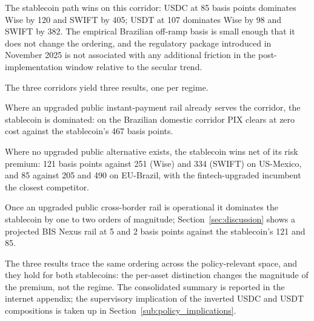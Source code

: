 The stablecoin path wins on this corridor: USDC at 85 basis points dominates Wise by 120 and SWIFT by 405; USDT at 107 dominates Wise by 98 and SWIFT by 382. The empirical Brazilian off-ramp basis is small enough that it does not change the ordering, and the regulatory package introduced in November 2025 is not associated with any additional friction in the post-implementation window relative to the secular trend.

The three corridors yield three results, one per regime.

\begin{result}\label{res:dominated}
Where an upgraded public instant-payment rail already serves the corridor, the stablecoin is dominated: on the Brazilian domestic corridor PIX clears at zero cost against the stablecoin's 467 basis points.
\end{result}

\begin{result}\label{res:wins}
Where no upgraded public alternative exists, the stablecoin wins net of its risk premium: 121 basis points against 251 (Wise) and 334 (SWIFT) on US-Mexico, and 85 against 205 and 490 on EU-Brazil, with the fintech-upgraded incumbent the closest competitor.
\end{result}

\begin{result}\label{res:absorbed}
Once an upgraded public cross-border rail is operational it dominates the stablecoin by one to two orders of magnitude; Section~\ref{sec:discussion} shows a projected BIS Nexus rail at 5 and 2 basis points against the stablecoin's 121 and 85.
\end{result}

The three results trace the same ordering across the policy-relevant space, and they hold for both stablecoins: the per-asset distinction changes the magnitude of the premium, not the regime. The consolidated summary is reported in the internet appendix; the supervisory implication of the inverted USDC and USDT compositions is taken up in Section~\ref{sub:policy_implications}.
